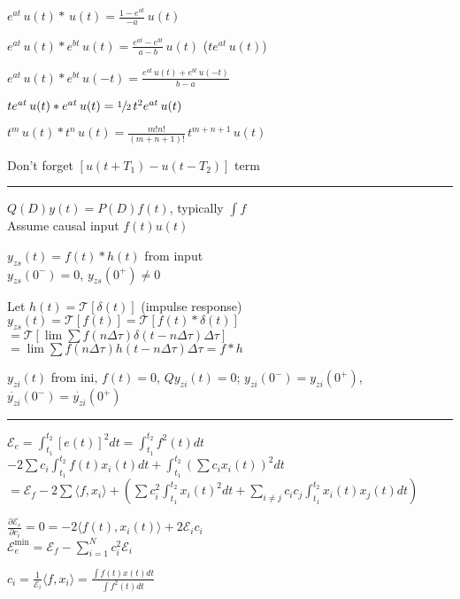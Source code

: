 \documentclass[4pt]{article}
\theoremstyle{definition}
\theoremstyle{definition}
\begin{document}
\begin{multicols}{3}
    $e^{at} \,u(t)* \,u(t) = \frac{1-e^{at}}{-a}\, u(t)$

    $e^{at}\,u(t) * e^{bt}\,u(t) = \frac{e^{at} - e^{bt}}{a - b}\, u(t)$ ($te^{at} \, u(t)$) 

    $e^{at}\, u(t) * e^{bt} \,u(-t) = \frac{e^{at} \, u(t) + e^{bt} \, u(-t)}{b-a}$

    $te^{at}\,u(t) * e^{at} \,u(t)= \sfrac{1}{2} \,t^2e^{at} \, u(t)$

    $t^m\, u(t) * t^n \, u(t) = \frac{m!n!}{(m+n+1)!}\, t^{m+n+1} \, u(t)$

    Don't forget $[u(t+T_1) - u(t-T_2)]$ term
\rule{\linewidth}{0.5pt}
    $Q(D) y(t) = P(D) f(t)$, typically $\int f$\\
    Assume causal input $f(t) u(t)$

    $y_{zs}(t) = f(t) * h(t)$ from input\\    
        $y_{zs}(0^-) = 0$, $y_{zs}(0^+) \neq 0$

        Let $h(t) = \mathcal{T} [\delta (t)]$ (impulse response)
            $y_{zs}(t)=\mathcal{T} [f(t)] = \mathcal{T} [f(t) * \delta (t)]$\\
            $=\mathcal{T}[\lim\sum f(n\Delta\tau) \delta(t - n\Delta\tau) \Delta\tau]$\\
            $=\lim\sum f(n\Delta\tau) h(t-n\Delta\tau)\Delta\tau = f * h$
            
        $y_{zi}(t)$ from ini, $f(t)=0$,
            $Q y_{zi}(t) = 0$;
            $y_{zi}(0^-) = y_{zi}(0^+)$, $\dot{y_{zi}}(0^-) = \dot{y_{zi}}(0^+)$
\rule{\linewidth}{0.5pt}
    $\mathcal{E}_e = \int_{t_1}^{t_2} [e(t)]^2 dt = \int_{t_1}^{t_2} f^2(t)dt$\\
    $- 2\sum c_i \int_{t_1}^{t_2} f(t) x_i(t) dt + \int_{t_1}^{t_2} (\sum c_i x_i(t))^2 dt$\\
    $    = \mathcal{E}_f
    -  2\sum \langle f, x_i \rangle +
    (\sum c_i^2 \int_{t_1}^{t_2} x_i(t)^2 dt + \sum_{i\neq j} c_i c_j \int_{t_1}^{t_2} x_i(t) x_j(t) dt)$
        
    $\frac{\partial \mathcal{E}_e}{\partial c_i} = 0 = -2 \langle f(t), x_i(t)\rangle + 2\mathcal{E}_i c_i$\\
    $\mathcal{E}_e^{\text{min}} = \mathcal{E}_f - \sum_{i=1}^N c_i^2 \mathcal{E}_i$

    \(c_i = \frac{1}{\mathcal{E}_i}\langle f, x_i\rangle = \frac{\int f(t) x(t) dt}{\int f^2(t) dt}\)    


\end{multicols}
\end{document}
